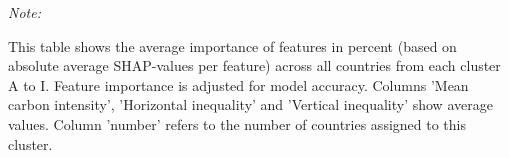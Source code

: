 \begin{table}[H]
{\begin{threeparttable}
\begin{tabular}[t]{lrrrrrrrrrrrrrrrrrrrr}
\bottomrule
\end{tabular}
\begin{tablenotes}
\item \textit{Note: } 
\item This table shows the average importance of features in percent (based on absolute average SHAP-values per feature) across all countries from each cluster A to I. Feature importance is adjusted for model accuracy. Columns 'Mean carbon intensity', 'Horizontal inequality' and 'Vertical inequality' show average values. Column 'number' refers to the number of countries assigned to this cluster.
\end{tablenotes}
\end{threeparttable}}
\end{table}

